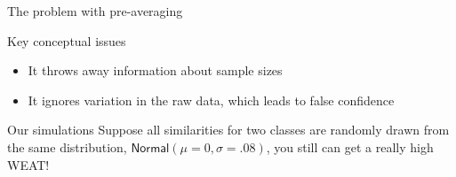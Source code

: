\documentclass[
  10pt,
  ignorenonframetext,
  x11names, dvipsnames, bibspacing,natbib, table]{beamer}
\providecommand{\tightlist}{%
  \setlength{\itemsep}{0pt}\setlength{\parskip}{0pt}}
\begin{document}
\begin{frame}{The problem with pre-averaging}
\protect\hypertarget{the-problem-with-pre-averaging}{}
\begin{block}{Key conceptual issues}
\protect\hypertarget{key-conceptual-issues}{}
\begin{itemize}
\tightlist
\item
  It throws away information about sample sizes
\item
  It ignores variation in the raw data, which leads to false confidence
\end{itemize}

\pause
\end{block}

\begin{block}{Our simulations}
\protect\hypertarget{our-simulations}{}
Suppose all similarities for two classes are randomly drawn from the
same distribution, \(\mathsf{Normal}(\mu = 0, \sigma = .08)\), you still
can get a really high WEAT!
\end{block}
\end{frame}
\end{document}
